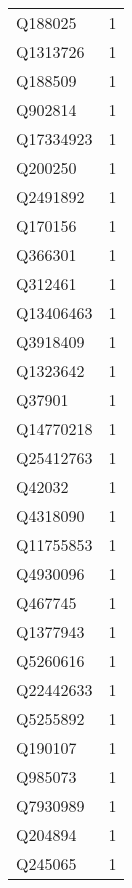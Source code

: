 \begin{tabular}{lr}
     Q188025 &                             1 \\
    Q1313726 &                             1 \\
     Q188509 &                             1 \\
     Q902814 &                             1 \\
   Q17334923 &                             1 \\
     Q200250 &                             1 \\
    Q2491892 &                             1 \\
     Q170156 &                             1 \\
     Q366301 &                             1 \\
     Q312461 &                             1 \\
   Q13406463 &                             1 \\
    Q3918409 &                             1 \\
    Q1323642 &                             1 \\
      Q37901 &                             1 \\
   Q14770218 &                             1 \\
   Q25412763 &                             1 \\
      Q42032 &                             1 \\
    Q4318090 &                             1 \\
   Q11755853 &                             1 \\
    Q4930096 &                             1 \\
     Q467745 &                             1 \\
    Q1377943 &                             1 \\
    Q5260616 &                             1 \\
   Q22442633 &                             1 \\
    Q5255892 &                             1 \\
     Q190107 &                             1 \\
     Q985073 &                             1 \\
    Q7930989 &                             1 \\
     Q204894 &                             1 \\
     Q245065 &                             1 \\

\end{tabular}
